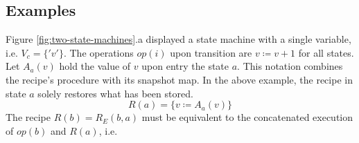 \documentclass[12pt,a4paper]{scrartcl}
\begin{document}
\subsection{Examples}
                 
Figure \ref{fig:two-state-machines}.a displayed a state machine with a single
variable, i.e. $V_c=\{'v'\}$. The operations $op(i)$ upon transition are
$v\coloneqq v+1$ for all states. Let $A_a(v)$ hold the value of $v$ upon entry the
state $a$.  This notation combines the recipe's procedure with its snapshot
map.  In the above example, the recipe in state $a$ solely restores what has
been stored.
\begin{equation} 
    R(a) = \{ v \coloneqq  A_a(v) \} 
\end{equation}
The recipe $R(b)=R_E(b,a)$ must be equivalent to the concatenated execution of $op(b)$
and $R(a)$, i.e.
\end{document}
